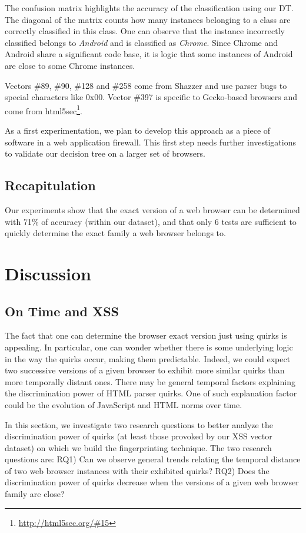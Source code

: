 \documentclass[10pt]{IEEEtran}
\begin{document}
The confusion matrix highlights the accuracy of the classification using our DT. The diagonal of 
the matrix counts how many instances belonging to a class are correctly classified in this 
class. One can observe that the instance incorrectly classified belongs to \textit{Android}
and is classified as \textit{Chrome}. Since Chrome and Android share a significant code base, it is 
logic that some instances of Android are close to some Chrome instances.




Vectors \#89, \#90, \#128 and \#258 come from Shazzer and use parser bugs to special characters like 0x00. 
Vector \#397 is specific to Gecko-based browsers and come from html5sec\footnote{\url{http://html5sec.org/#15}}.




As a first experimentation, we plan to develop this approach as a piece of software in a web 
application firewall. This first step needs further investigations to validate our decision
tree on a larger set of browsers.

\subsection{Recapitulation}
Our experiments show that the exact version of a web browser can be determined with 71\% of 
accuracy (within our dataset), and that only 6 tests are sufficient to quickly determine the exact family a web 
browser belongs to. 


\section{Discussion}
\label{sec:analysis}
\subsection{On Time and XSS}
The fact that one can determine the browser exact version just using
quirks is appealing. In particular, one can wonder whether there is
some underlying logic in the way the quirks occur, making them
predictable. Indeed, we could expect two successive versions of a
given browser to exhibit more similar quirks than more temporally
distant ones. 
There may be general temporal
factors explaining the discrimination power of HTML parser quirks. One of such
explanation factor could be the evolution of JavaScript and HTML norms
over time. 




In this section, we investigate two research questions
to better analyze the discrimination power of quirks (at least those
provoked by our XSS vector dataset) on which we build the
fingerprinting technique.
The two research questions are:
RQ1) Can we observe general trends relating the temporal distance of
two web browser instances with their exhibited quirks?
RQ2) Does the discrimination power of quirks decrease when the
versions of a given web browser family are close? 
\end{document}
